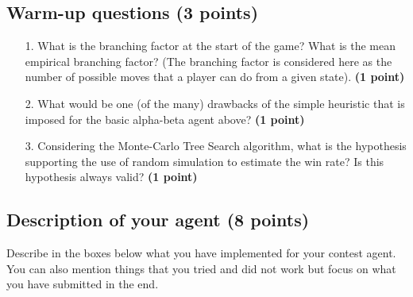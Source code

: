 \documentclass[11pt,a4paper]{report}
\begin{document}
\subsection{Warm-up questions (3 points)}
\begin{enumerate}
\item[1.] What is the branching factor at the start of the game? What is the mean empirical branching factor? (The branching factor is considered here as the number of possible moves that a player can do from a given state). \textbf{(1 point)}
\end{enumerate}

\begin{answers}[5cm]
\end{answers}



\begin{enumerate}
\item[2.] What would be one (of the many) drawbacks of the simple heuristic that is imposed for the basic alpha-beta agent above? \textbf{(1 point)}
\end{enumerate}

\begin{answers}[10cm]
\end{answers}



\begin{enumerate}
\item[3.] Considering the Monte-Carlo Tree Search algorithm, what is the hypothesis supporting the use of random simulation to estimate the win rate? Is this hypothesis always valid? \textbf{(1 point)}
\end{enumerate}

\begin{answers}[15cm]
\end{answers}


\newpage
\subsection{Description of your agent (8 points)}
Describe in the boxes below what you have implemented for your contest agent. You can also mention things that you tried and did not work but focus on what you have submitted in the end.

\begin{answers}[21cm]
\end{answers}
\end{document}
